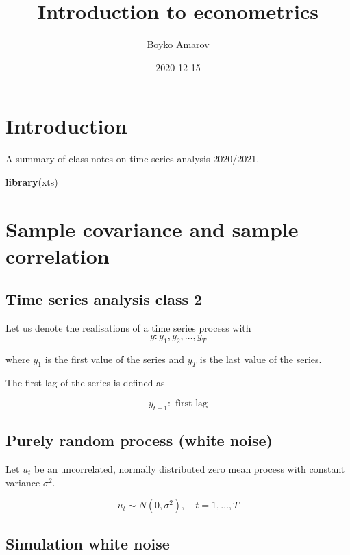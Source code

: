 \documentclass[
]{book}
\title{Introduction to econometrics}
\author{Boyko Amarov}
\date{2020-12-15}
\newenvironment{Shaded}{\begin{snugshade}}{\end{snugshade}}
\newcommand{\KeywordTok}[1]{\textcolor[rgb]{0.13,0.29,0.53}{\textbf{#1}}}
\newcommand{\NormalTok}[1]{#1}
\begin{document}
\maketitle

{
\setcounter{tocdepth}{1}
\tableofcontents
}
\hypertarget{introduction}{%
\chapter{Introduction}\label{introduction}}

A summary of class notes on time series analysis 2020/2021.

\begin{Shaded}
\begin{Highlighting}[]
\KeywordTok{library}\NormalTok{(xts)}
\end{Highlighting}
\end{Shaded}

\hypertarget{covariance}{%
\chapter{Sample covariance and sample correlation}\label{covariance}}

\hypertarget{time-series-analysis-class-2}{%
\section{Time series analysis class 2}\label{time-series-analysis-class-2}}

Let us denote the realisations of a time series process with
\[
y: y_1, y_2,\ldots,y_T
\]

where \(y_1\) is the first value of the series and \(y_T\) is the last value of the series.

The first lag of the series is defined as

\[
y_{t - 1}: \text{ first lag}
\]

\hypertarget{purely-random-process-white-noise}{%
\section{Purely random process (white noise)}\label{purely-random-process-white-noise}}

Let \(u_t\) be an uncorrelated, normally distributed zero mean process with constant variance \(\sigma^2\).

\[
u_{t} \sim N(0, \sigma^2), \quad t=1,\ldots,T
\]

\hypertarget{simulation-white-noise}{%
\section{Simulation white noise}\label{simulation-white-noise}}
\end{document}
